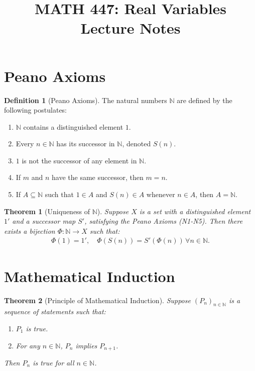 \documentclass[9pt]{article}
\title{MATH 447: Real Variables \\ Lecture Notes}
\theoremstyle{definition}
\newtheorem{definition}{Definition}
\theoremstyle{plain}
\newtheorem{theorem}{Theorem}
\begin{document}
\maketitle

\section*{Peano Axioms}
\begin{definition}[Peano Axioms]
The natural numbers $ \mathbb{N} $ are defined by the following postulates:
\begin{enumerate}[label=(N\arabic*)]
    \item $ \mathbb{N} $ contains a distinguished element $ 1 $.
    \item Every $ n \in \mathbb{N} $ has its successor in $ \mathbb{N} $, denoted $ S(n) $.
    \item $ 1 $ is not the successor of any element in $ \mathbb{N} $.
    \item If $ m $ and $ n $ have the same successor, then $ m = n $.
    \item If $ A \subseteq \mathbb{N} $ such that $ 1 \in A $ and $ S(n) \in A $ whenever $ n \in A $, then $ A = \mathbb{N} $.
\end{enumerate}
\end{definition}

\begin{theorem}[Uniqueness of $ \mathbb{N} $]
Suppose $ X $ is a set with a distinguished element $ 1' $ and a successor map $ S' $, satisfying the Peano Axioms (N1-N5). Then there exists a bijection $ \Phi : \mathbb{N} \to X $ such that:
\begin{align*}
    \Phi(1) = 1', \quad \Phi(S(n)) = S'(\Phi(n)) \, \forall n \in \mathbb{N}.
\end{align*}
\end{theorem}

\section*{Mathematical Induction}
\begin{theorem}[Principle of Mathematical Induction]
Suppose $ (P_n)_{n \in \mathbb{N}} $ is a sequence of statements such that:
\begin{enumerate}
    \item $ P_1 $ is true.
    \item For any $ n \in \mathbb{N} $, $ P_n $ implies $ P_{n+1} $.
\end{enumerate}
Then $ P_n $ is true for all $ n \in \mathbb{N} $.
\end{theorem}
\end{document}
